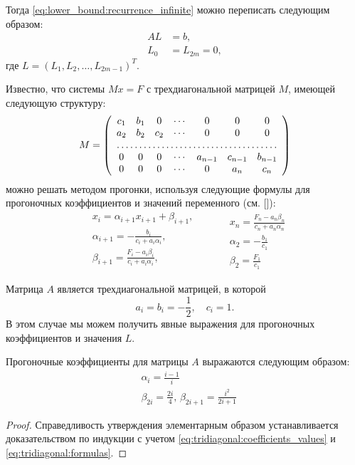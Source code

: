 Тогда \eqref{eq:lower_bound:recurrence_infinite} можно переписать следующим образом:
\[
\begin{aligned}
AL &= b, \\
L_0 &= L_{2m} = 0,
\end{aligned}
\]
где $ L = (L_1, L_2, \ldots, L_{2m-1})^T $.

Известно, что системы $ Mx = F $ с трехдиагональной матрицей $ M $, имеющей следующую структуру:
\[
M = \left(\begin{array}{ccccccc}
c_1 & b_1 & 0 & \cdots & 0 & 0 & 0 \\
a_2 & b_2 & c_2 & \cdots & 0 & 0 & 0 \\
\hdotsfor{7} \\
0 & 0 & 0 & \cdots & a_{n-1} & c_{n-1} & b_{n-1} \\
0 & 0 & 0 & \cdots & 0 & a_n & c_n
\end{array}\right)
\]
можно решать методом прогонки, используя следующие формулы для прогоночных коэффициентов и значений переменного (см. [\samarsky]):
\begin{equation}
\label{eq:tridiagonal:formulas}
\begin{split}
    &x_i = \alpha_{i+1} x_{i+1} + \beta_{i+1}, \\
    &\alpha_{i+1} = -\frac{b_i}{c_i + a_i\alpha_i}, \\
    &\beta_{i+1} = \frac{F_i - a_i\beta_i}{c_i + a_i\alpha_i}, \\
\end{split}
\qquad
\begin{split}
    &x_n = \frac{F_n - a_n\beta_n}{c_n + a_n\alpha_n} \\
    &\alpha_2 = -\frac{b_1}{c_1} \\
    &\beta_2 = \frac{F_1}{c_1}
\end{split}
\end{equation}

Матрица $ A $ является трехдиагональной матрицей, в которой 
\begin{equation}
\label{eq:tridiagonal:coefficients_values}
a_i = b_i = -\frac{1}{2}, \quad c_i = 1.
\end{equation}
В этом случае мы можем получить явные выражения для прогоночных коэффициентов и значения $ L $.

\begin{utver}
\label{utver:tridiagonal:coefficients}
Прогоночные коэффициенты для матрицы $ A $ выражаются следующим образом:
\begin{align}
\label{eq:tridiagonal:alpha}
&\alpha_i = \frac{i-1}{i} \\
\label{eq:tridiagonal:beta}
&\beta_{2i} = \frac{2i}{4}, \,
\beta_{2i+1} = \frac{i^2}{2i+1}
\end{align}
\end{utver}
\begin{proof}
Справедливость утверждения элементарным образом устанавливается доказательством по индукции с учетом \eqref{eq:tridiagonal:coefficients_values} и \eqref{eq:tridiagonal:formulas}.
\end{proof}

